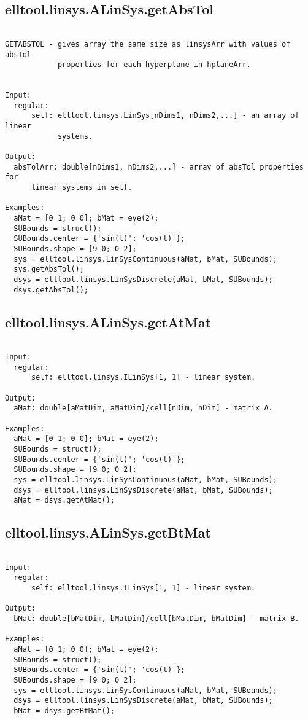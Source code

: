 \subsection{\texorpdfstring{elltool.linsys.ALinSys.getAbsTol}{getAbsTol}}\label{method:elltool.linsys.ALinSys.getAbsTol}
\begin{verbatim}

GETABSTOL - gives array the same size as linsysArr with values of absTol
            properties for each hyperplane in hplaneArr.


Input:
  regular:
      self: elltool.linsys.LinSys[nDims1, nDims2,...] - an array of linear
            systems.

Output:
  absTolArr: double[nDims1, nDims2,...] - array of absTol properties for
      linear systems in self.

Examples:
  aMat = [0 1; 0 0]; bMat = eye(2);
  SUBounds = struct();
  SUBounds.center = {'sin(t)'; 'cos(t)'};
  SUBounds.shape = [9 0; 0 2];
  sys = elltool.linsys.LinSysContinuous(aMat, bMat, SUBounds);
  sys.getAbsTol();
  dsys = elltool.linsys.LinSysDiscrete(aMat, bMat, SUBounds);
  dsys.getAbsTol();
\end{verbatim}
\subsection{\texorpdfstring{elltool.linsys.ALinSys.getAtMat}{getAtMat}}\label{method:elltool.linsys.ALinSys.getAtMat}
\begin{verbatim}

Input:
  regular:
      self: elltool.linsys.ILinSys[1, 1] - linear system.

Output:
  aMat: double[aMatDim, aMatDim]/cell[nDim, nDim] - matrix A.

Examples:
  aMat = [0 1; 0 0]; bMat = eye(2);
  SUBounds = struct();
  SUBounds.center = {'sin(t)'; 'cos(t)'};
  SUBounds.shape = [9 0; 0 2];
  sys = elltool.linsys.LinSysContinuous(aMat, bMat, SUBounds);
  dsys = elltool.linsys.LinSysDiscrete(aMat, bMat, SUBounds);
  aMat = dsys.getAtMat();
\end{verbatim}
\subsection{\texorpdfstring{elltool.linsys.ALinSys.getBtMat}{getBtMat}}\label{method:elltool.linsys.ALinSys.getBtMat}
\begin{verbatim}

Input:
  regular:
      self: elltool.linsys.ILinSys[1, 1] - linear system.

Output:
  bMat: double[bMatDim, bMatDim]/cell[bMatDim, bMatDim] - matrix B.

Examples:
  aMat = [0 1; 0 0]; bMat = eye(2);
  SUBounds = struct();
  SUBounds.center = {'sin(t)'; 'cos(t)'};
  SUBounds.shape = [9 0; 0 2];
  sys = elltool.linsys.LinSysContinuous(aMat, bMat, SUBounds);
  dsys = elltool.linsys.LinSysDiscrete(aMat, bMat, SUBounds);
  bMat = dsys.getBtMat();
\end{verbatim}

